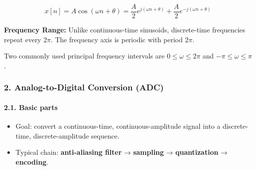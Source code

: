 \[  
x[n]
=
A\cos(\omega n+\theta)
=
\frac{A}{2}e^{j(\omega n+\theta)}  
+  
\frac{A}{2}e^{-j(\omega n+\theta)}  
\]

\textbf{Frequency Range:} Unlike continuous-time sinusoids,
discrete-time frequencies repeat every \(2\pi\). The frequency axis is
periodic with period \(2\pi\).

Two commonly used principal frequency intervals are
\(0\le\omega\le2\pi\) and \(-\pi\le\omega\le\pi\).

\subsubsection{2. Analog-to-Digital Conversion
(ADC)}\label{analog-to-digital-conversion-adc}

\paragraph{2.1. Basic parts}\label{basic-parts}

\begin{itemize}
\tightlist
\item
  Goal: convert a continuous-time, continuous-amplitude signal into a
  discrete-time, discrete-amplitude sequence.
\item
  Typical chain: \textbf{anti-aliasing filter} → \textbf{sampling} →
  \textbf{quantization} → \textbf{encoding}.
\end{itemize}

